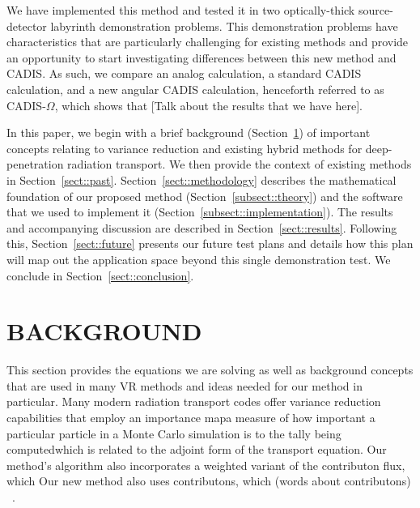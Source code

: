 \documentclass[12pt]{article}
\begin{document}
We have implemented this method and tested it in two optically-thick source-detector labyrinth demonstration problems. 
This demonstration problems have characteristics that are particularly challenging for existing methods and provide an opportunity to start investigating differences between this new method and CADIS.
As such, we compare an analog calculation, a standard CADIS calculation, and a new angular CADIS calculation, henceforth referred to as CADIS-$\Omega$, which shows that [Talk about the results that we have here]. 

In this paper, we begin with a brief background (Section~\ref{sect::second}) of important concepts relating to variance reduction and existing hybrid methods for deep-penetration radiation transport.
We then provide the context of existing methods in Section~\ref{sect::past}. 
Section~\ref{sect::methodology} describes the mathematical foundation of our proposed method (Section~\ref{subsect::theory}) and the software that we used to implement it (Section~\ref{subsect::implementation}). 
The results and accompanying discussion are described in Section~\ref{sect::results}. Following this, Section~\ref{sect::future} presents our future test plans and details how this plan will map out the application space beyond this single demonstration test. 
We conclude in Section~\ref{sect::conclusion}. 


%
\section{BACKGROUND}
\label{sect::second}

This section provides the equations we are solving as well as background concepts that are used in many VR methods and ideas needed for our method in particular. 
Many modern radiation transport codes offer variance reduction capabilities that employ an importance map\textemdash a measure of how important a particular particle in a Monte Carlo simulation is to the tally being computed\textemdash which is related to the adjoint form of the transport equation. 
Our method's algorithm also incorporates a weighted variant of the contributon flux, which 
Our new method also uses contributons, which (words about contributons) ~\cite{williams_contributorn_1992}. 
\end{document}

